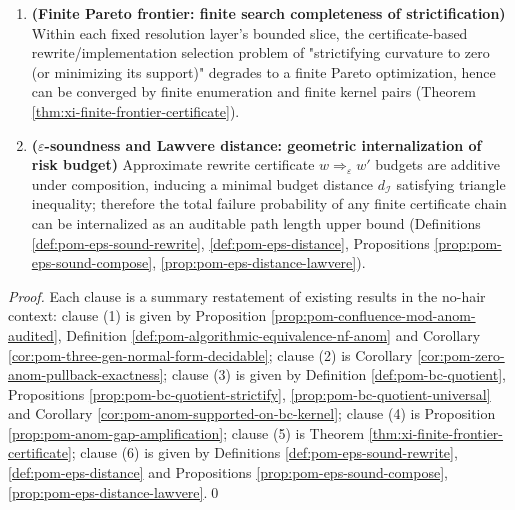 \begin{theorem}
\begin{enumerate}
  \(
  [\mathrm{Anom}(w^{\boxtimes q})]=q\cdot[\mathrm{Anom}(w)]
  \), thus weak residues can be linearly amplified to any preset auditable threshold (Proposition \ref{prop:pom-anom-gap-amplification}).
  \item \textbf{(Finite Pareto frontier: finite search completeness of strictification)}
  Within each fixed resolution layer's bounded slice, the certificate-based rewrite/implementation selection problem of "strictifying curvature to zero (or minimizing its support)" degrades to a finite Pareto optimization,
  hence can be converged by finite enumeration and finite kernel pairs (Theorem \ref{thm:xi-finite-frontier-certificate}).
  \item \textbf{(\texorpdfstring{$\varepsilon$}{eps}-soundness and Lawvere distance: geometric internalization of risk budget)}
  Approximate rewrite certificate \(w\Longrightarrow_{\varepsilon} w'\) budgets are additive under composition, inducing a minimal budget distance \(d_{\mathcal I}\) satisfying triangle inequality;
  therefore the total failure probability of any finite certificate chain can be internalized as an auditable path length upper bound (Definitions \ref{def:pom-eps-sound-rewrite}, \ref{def:pom-eps-distance}, Propositions \ref{prop:pom-eps-sound-compose}, \ref{prop:pom-eps-distance-lawvere}).
\end{enumerate}
\end{theorem}

\begin{proof}
Each clause is a summary restatement of existing results in the no-hair context: clause (1) is given by Proposition \ref{prop:pom-confluence-mod-anom-audited}, Definition \ref{def:pom-algorithmic-equivalence-nf-anom} and Corollary \ref{cor:pom-three-gen-normal-form-decidable}; clause (2) is Corollary \ref{cor:pom-zero-anom-pullback-exactness}; clause (3) is given by Definition \ref{def:pom-bc-quotient}, Propositions \ref{prop:pom-bc-quotient-strictify}, \ref{prop:pom-bc-quotient-universal} and Corollary \ref{cor:pom-anom-supported-on-bc-kernel}; clause (4) is Proposition \ref{prop:pom-anom-gap-amplification}; clause (5) is Theorem \ref{thm:xi-finite-frontier-certificate}; clause (6) is given by Definitions \ref{def:pom-eps-sound-rewrite}, \ref{def:pom-eps-distance} and Propositions \ref{prop:pom-eps-sound-compose}, \ref{prop:pom-eps-distance-lawvere}.\qed
\end{proof}

